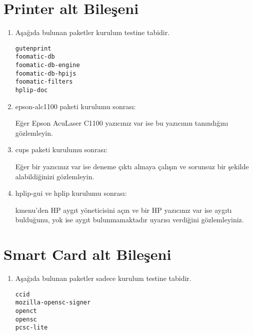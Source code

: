 \documentclass[a4paper,10pt]{article}
\begin{document}
\section{Printer alt Bileşeni}
\begin{enumerate}

\item Aşağıda bulunan paketler kurulum testine tabidir.
\begin{verbatim}
gutenprint 
foomatic-db
foomatic-db-engine
foomatic-db-hpijs
foomatic-filters
hplip-doc
\end{verbatim}
\item epson-alc1100 paketi kurulumu sonrası:

Eğer Epson AcuLaser C1100 yazıcınız var ise bu yazıcının tanındığını gözlemleyin.

\item cups paketi kurulumu sonrası:

Eğer bir yazıcınız var ise deneme çıktı almaya çalışın ve sorunsuz bir şekilde alabildiğinizi gözlemleyin.

\item hplip-gui ve hplip kurulumu sonrası:

kmenu'den HP aygıt yöneticisini açın ve bir HP yazıcınız var ise aygıtı bulduğunu, yok ise aygıt bulunmamaktadır uyarısı verdiğini gözlemleyiniz.
    
\end{enumerate}

\section{Smart Card alt Bileşeni}
\begin{enumerate}
 \item Aşağıda bulunan paketler sadece kurulum testine tabidir.
\begin{verbatim}
ccid 
mozilla-opensc-signer
openct
opensc
pcsc-lite
\end{verbatim}


\end{enumerate}
\end{document}
